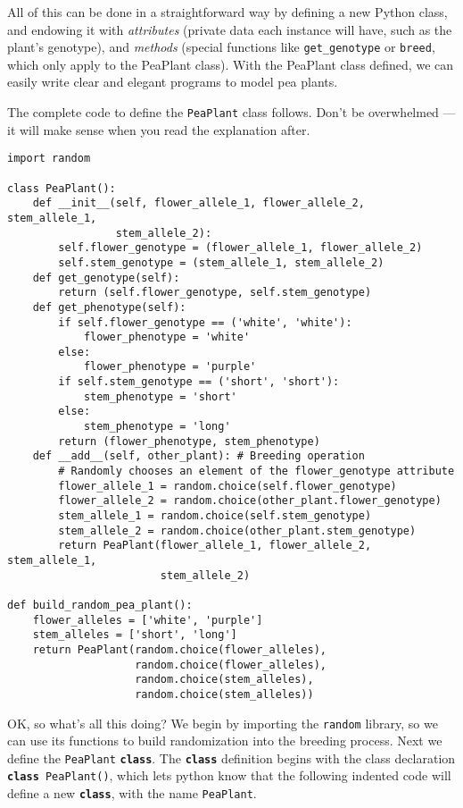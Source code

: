 All of this can be done in a straightforward way by defining a new Python class, and endowing it with \emph{attributes} (private data each instance will have, such as the plant's genotype), and \emph{methods} (special functions like \texttt{get\_genotype} or \texttt{breed}, which only apply to the PeaPlant class). With the PeaPlant class defined, we can easily write clear and elegant programs to model pea plants.

The complete code to define the \texttt{PeaPlant} class follows. Don't be overwhelmed --- it will make sense when you read the explanation after.

\clearpage

\begin{lstlisting}
import random

class PeaPlant():
	def __init__(self, flower_allele_1, flower_allele_2, stem_allele_1, 
	             stem_allele_2):
		self.flower_genotype = (flower_allele_1, flower_allele_2)
		self.stem_genotype = (stem_allele_1, stem_allele_2)
	def get_genotype(self):
		return (self.flower_genotype, self.stem_genotype)
	def get_phenotype(self):
		if self.flower_genotype == ('white', 'white'):
			flower_phenotype = 'white'
		else:
			flower_phenotype = 'purple'
		if self.stem_genotype == ('short', 'short'):
			stem_phenotype = 'short'
		else:
			stem_phenotype = 'long'
		return (flower_phenotype, stem_phenotype)
	def __add__(self, other_plant): # Breeding operation
		# Randomly chooses an element of the flower_genotype attribute
		flower_allele_1 = random.choice(self.flower_genotype) 
		flower_allele_2 = random.choice(other_plant.flower_genotype)
		stem_allele_1 = random.choice(self.stem_genotype)
		stem_allele_2 = random.choice(other_plant.stem_genotype)
		return PeaPlant(flower_allele_1, flower_allele_2, stem_allele_1, 
		                stem_allele_2)
	
def build_random_pea_plant():
	flower_alleles = ['white', 'purple']
	stem_alleles = ['short', 'long']
	return PeaPlant(random.choice(flower_alleles), 
	                random.choice(flower_alleles), 
	                random.choice(stem_alleles), 
	                random.choice(stem_alleles))
\end{lstlisting}

OK, so what's all this doing? We begin by importing the \texttt{random} library, so we can use its functions to build randomization into the breeding process.
Next we define the \texttt{PeaPlant} \texttt{\textbf{class}}. The \texttt{\textbf{class}} definition begins with the class declaration \texttt{\textbf{class} PeaPlant()}, which lets python know that the following indented code will define a new \texttt{\textbf{class}}, with the name \texttt{PeaPlant}.

